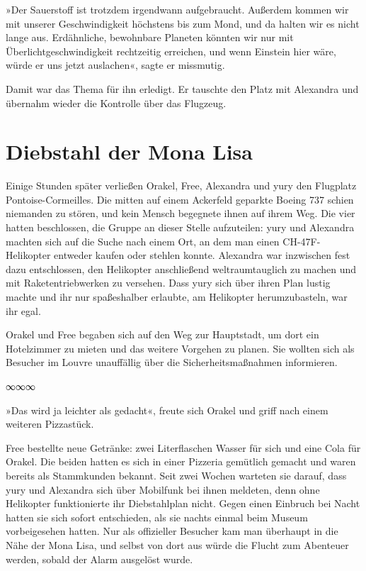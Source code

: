 »Der Sauerstoff ist trotzdem irgendwann aufgebraucht. Außerdem kommen wir mit unserer Geschwindigkeit höchstens bis zum Mond, und da halten wir es nicht lange aus. Erdähnliche, bewohnbare Planeten könnten wir nur mit Überlichtgeschwindigkeit rechtzeitig erreichen, und wenn Einstein hier wäre, würde er uns jetzt auslachen«, sagte er missmutig.

Damit war das Thema für ihn erledigt. Er tauschte den Platz mit Alexandra und übernahm wieder die Kontrolle über das Flugzeug.


\chapter{Diebstahl der Mona Lisa}

Einige Stunden später verließen Orakel, Free, Alexandra und yury den Flugplatz Pontoise-Cormeilles. Die mitten auf einem Ackerfeld geparkte Boeing 737 schien niemanden zu stören, und kein Mensch begegnete ihnen auf ihrem Weg. Die vier hatten beschlossen, die Gruppe an dieser Stelle aufzuteilen: yury und Alexandra machten sich auf die Suche nach einem Ort, an dem man einen CH-47F-Helikopter entweder kaufen oder stehlen konnte. Alexandra war inzwischen fest dazu entschlossen, den Helikopter anschließend weltraumtauglich zu machen und mit Raketentriebwerken zu versehen. Dass yury sich über ihren Plan lustig machte und ihr nur spaßeshalber erlaubte, am Helikopter herumzubasteln, war ihr egal.

Orakel und Free begaben sich auf den Weg zur Hauptstadt, um dort ein Hotelzimmer zu mieten und das weitere Vorgehen zu planen. Sie wollten sich als Besucher im Louvre unauffällig über die Sicherheitsmaßnahmen informieren.

\begin{center}
    ∞∞∞
\end{center}

»Das wird ja leichter als gedacht«, freute sich Orakel und griff nach einem weiteren Pizzastück.

Free bestellte neue Getränke: zwei Literflaschen Wasser für sich und eine Cola für Orakel. Die beiden hatten es sich in einer Pizzeria gemütlich gemacht und waren bereits als Stammkunden bekannt. Seit zwei Wochen warteten sie darauf, dass yury und Alexandra sich über Mobilfunk bei ihnen meldeten, denn ohne Helikopter funktionierte ihr Diebstahlplan nicht. Gegen einen Einbruch bei Nacht hatten sie sich sofort entschieden, als sie nachts einmal beim Museum vorbeigesehen hatten. Nur als offizieller Besucher kam man überhaupt in die Nähe der Mona Lisa, und selbst von dort aus würde die Flucht zum Abenteuer werden, sobald der Alarm ausgelöst wurde.


